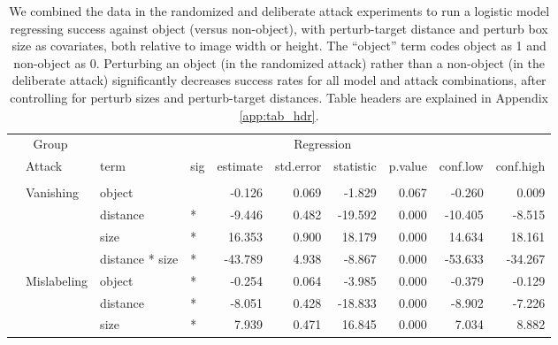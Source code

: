 \begingroup\fontsize{9}{11}\selectfont

\begin{longtable}[t]{llllrrrrrr}
\caption{\label{tab:rand_arb_compare_table}We combined the data in the randomized and deliberate attack experiments to run a logistic model regressing success against object (versus non-object), with perturb-target distance and perturb box size as covariates, both relative to image width or height. The ``object'' term codes object as 1 and non-object as 0. Perturbing an object (in the randomized attack) rather than a non-object (in the deliberate attack) significantly decreases success rates for all model and attack combinations, after controlling for perturb sizes and perturb-target distances. Table headers are explained in Appendix \ref{app:tab_hdr}.}\\
\toprule
\multicolumn{2}{c}{Group} & \multicolumn{8}{c}{Regression} \\
\cmidrule(l{3pt}r{3pt}){1-2} \cmidrule(l{3pt}r{3pt}){3-10}
 & Attack & term & sig & estimate & std.error & statistic & p.value & conf.low & conf.high\\
\midrule
\addlinespace[0.3em]
\multicolumn{10}{l}{\textbf{YOLOv3}}\\
\hspace{1em} & Vanishing & object &  & -0.126 & 0.069 & -1.829 & 0.067 & -0.260 & 0.009\\
\cmidrule{3-10}\nopagebreak
\hspace{1em} &  & distance & * & -9.446 & 0.482 & -19.592 & 0.000 & -10.405 & -8.515\\
\cmidrule{3-10}\nopagebreak
\hspace{1em} &  & size & * & 16.353 & 0.900 & 18.179 & 0.000 & 14.634 & 18.161\\
\cmidrule{3-10}\nopagebreak
\hspace{1em} &  & distance * size & * & -43.789 & 4.938 & -8.867 & 0.000 & -53.633 & -34.267\\
\cmidrule{2-10}\nopagebreak
\hspace{1em} & Mislabeling & object & * & -0.254 & 0.064 & -3.985 & 0.000 & -0.379 & -0.129\\
\cmidrule{3-10}\nopagebreak
\hspace{1em} &  & distance & * & -8.051 & 0.428 & -18.833 & 0.000 & -8.902 & -7.226\\
\cmidrule{3-10}\nopagebreak
\hspace{1em} &  & size & * & 7.939 & 0.471 & 16.845 & 0.000 & 7.034 & 8.882\\

\end{longtable}
